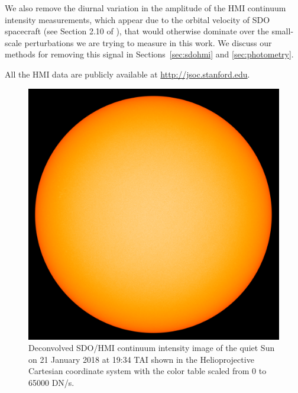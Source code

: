 We also remove the diurnal variation in the amplitude of the HMI continuum intensity measurements, which appear due to the orbital velocity of SDO spacecraft (see Section 2.10 of \citealp{couvidat16}), that would otherwise dominate over the small-scale perturbations we are trying to measure in this work. We discuss our methods for removing this signal in Sections~\ref{sec:sdohmi} and \ref{sec:photometry}.

All the HMI data are publicly available at \url{http://jsoc.stanford.edu}.

\begin{figure}
    \centering
    \includegraphics[scale=0.3]{stash/continuum_small.png}
    \caption{Deconvolved SDO/HMI continuum intensity image of the quiet Sun on 21 January 2018 at 19:34 TAI shown in the Helioprojective Cartesian coordinate system with the color table scaled from 0 to 65000 DN/s.}
    \label{fig:hmi}
\end{figure}

